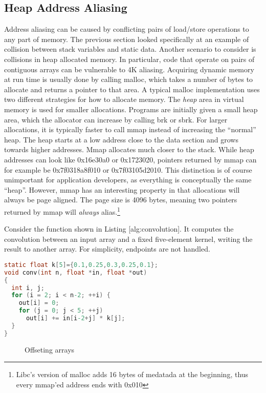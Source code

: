 \documentclass[a4paper,11pt,twocolumn,twoside]{article}
\begin{document}
\subsection{Heap Address Aliasing}
Address aliasing can be caused by conflicting pairs of load/store operations to any part of memory.
The previous section looked specifically at an example of collision between stack variables and static data.
Another scenario to consider is collisions in heap allocated memory.
In particular, code that operate on pairs of contiguous arrays can be vulnerable to 4K aliasing.
Acquiring dynamic memory at run time is usually done by calling malloc, which takes a number of bytes to allocate and returns a pointer to that area.
A typical malloc implementation uses two different strategies for how to allocate memory.
The \emph{heap} area in virtual memory is used for smaller allocations.
Programs are initially given a small heap area, which the allocator can increase by calling brk or sbrk.
For larger allocations, it is typically faster to call mmap instead of increasing the ``normal'' heap.
The heap starts at a low address close to the data section and grows towards higher addresses. 
Mmap allocates much closer to the stack.
While heap addresses can look like 0x16e30a0 or 0x1723020, pointers returned by mmap can for example be 0x7f0318a8f010 or 0x7f03105d2010.
This distinction is of course unimportant for application developers, as everything is conceptually the same ``heap''.
However, mmap has an interesting property in that allocations will always be page aligned.
The page size is 4096 bytes, meaning two pointers returned by mmap will \emph{always} alias.\footnote{Libc's version of malloc adds 16 bytes of medatada at the beginning, thus every mmap'ed address ends with 0x010}

Consider the function shown in Listing [alg:convolution].
It computes the convolution between an input array and a fixed five-element kernel, writing the result to another array.
For simplicity, endpoints are not handled.

\begin{lstlisting}[language=C]
static float k[5]={0.1,0.25,0.3,0.25,0.1};
void conv(int n, float *in, float *out)
{
  int i, j;
  for (i = 2; i < n-2; ++i) {
    out[i] = 0;
    for (j = 0; j < 5; ++j)
      out[i] += in[i-2+j] * k[j];
  }
}
\end{lstlisting}

\begin{figure}[t]
  \caption{Offseting arrays}
\end{figure}
\end{document}

